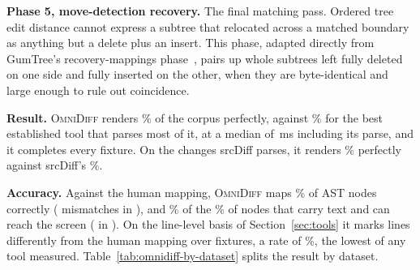 \documentclass[sigconf]{acmart}
\begin{document}
\textbf{Phase 5, move-detection recovery.} The final matching pass. Ordered tree edit distance cannot
express a subtree that relocated across a matched boundary as anything but a delete plus an
insert. This phase, adapted directly from GumTree's recovery-mappings
phase~\cite{gumtreediff-2014}, pairs up whole subtrees left fully deleted on one side and fully
inserted on the other, when they are byte-identical and large enough to rule out coincidence.

\textbf{Result.} \textsc{OmniDiff} renders \OmniDiffPerfectPct{}\% of the corpus perfectly,
against \DifftasticPerfectPct{}\% for the best established tool that parses most of it, at a
median of \SpeedOmniDiffPFifty{}\,ms including its parse, and it completes every fixture. On the
\SrcDiffFixtures{} changes srcDiff parses, it renders \SrcDiffSubsetOmniDiffPerfectPct{}\% perfectly
against srcDiff's \SrcDiffPerfectPct{}\%.

\textbf{Accuracy.} Against the human mapping, \textsc{OmniDiff} maps \NodeAccuracyPct{}\% of AST
nodes correctly (\NodeMismatches{} mismatches in \NodesTotal{}), and \VisibleNodeAccuracyPct{}\% of
the \VisibleNodeShare{}\% of nodes that carry text and can reach the screen
(\VisibleNodeMismatches{} in \VisibleNodesTotal{}). On the line-level basis of
Section~\ref{sec:tools} it marks \OmniDiffLineMismatches{} lines differently from the human
mapping over \OmniDiffFixtures{} fixtures, a rate of \OmniDiffLineRate{}\%, the lowest of any tool
measured. Table~\ref{tab:omnidiff-by-dataset} splits the result by dataset.


\end{document}
